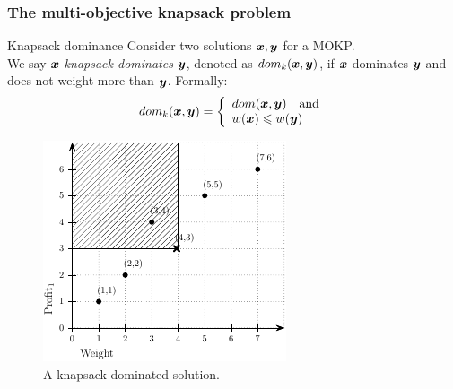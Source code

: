 \begin{frame}
\frametitle{The multi-objective knapsack problem}
\begin{block}{Knapsack dominance}
Consider two solutions $\boldsymbol{x}, \boldsymbol{y}$ for a MOKP.
\medskip \\
We say $\boldsymbol{x}$ \emph{knapsack-dominates} $\boldsymbol{y}$, denoted as $dom_k(\boldsymbol{x}, \boldsymbol{y})$,
if $\boldsymbol{x}$ dominates $\boldsymbol{y}$ and does not weight more than $\boldsymbol{y}$.
\pause
Formally:
\begin{equation*}
  \label{eq:kdom}
  dom_k(\boldsymbol{x}, \boldsymbol{y}) = \left\{
    \begin{array}{l}
      dom(\boldsymbol{x}, \boldsymbol{y}) \quad \text{and} \\
      w(\boldsymbol{x}) \leqslant w(\boldsymbol{y})
    \end{array}
  \right.
\end{equation*}
\end{block}
\pause
\begin{figure}
  \centering
  \includegraphics[scale=0.8]{img/kdt/dom}
  \caption{A knapsack-dominated solution.}
\end{figure}
\end{frame}
